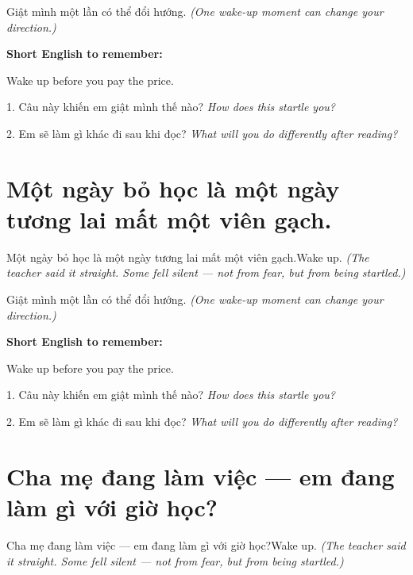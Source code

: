 \begin{baihoc}
Giật mình một lần có thể đổi hướng.
\textit{(One wake-up moment can change your direction.)}
\end{baihoc}

\begin{ghinhoanh}
\textbf{Short English to remember:}

Wake up before you pay the price.

\end{ghinhoanh}

\begin{tuhocnhanh}
1. Câu này khiến em giật mình thế nào? \textit{How does this startle you?}

2. Em sẽ làm gì khác đi sau khi đọc? \textit{What will you do differently after reading?}
\end{tuhocnhanh}
\ngancach


\section{Một ngày bỏ học là một ngày tương lai mất một viên gạch.}
\begin{truyen}{Một ngày bỏ học là một ngày tương lai mất một viên gạch.}{Wake up.}
\textit{(The teacher said it straight. Some fell silent — not from fear, but from being startled.)}
\end{truyen}

\begin{baihoc}
Giật mình một lần có thể đổi hướng.
\textit{(One wake-up moment can change your direction.)}
\end{baihoc}

\begin{ghinhoanh}
\textbf{Short English to remember:}

Wake up before you pay the price.

\end{ghinhoanh}

\begin{tuhocnhanh}
1. Câu này khiến em giật mình thế nào? \textit{How does this startle you?}

2. Em sẽ làm gì khác đi sau khi đọc? \textit{What will you do differently after reading?}
\end{tuhocnhanh}
\ngancach


\section{Cha mẹ đang làm việc — em đang làm gì với giờ học?}
\begin{truyen}{Cha mẹ đang làm việc — em đang làm gì với giờ học?}{Wake up.}
\textit{(The teacher said it straight. Some fell silent — not from fear, but from being startled.)}
\end{truyen}

